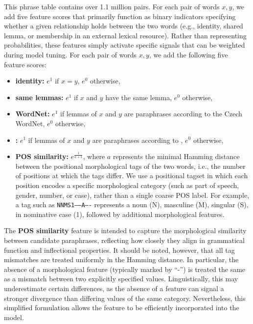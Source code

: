 This phrase table contains over 1.1 million pairs. For each pair of words $ x,y $, we add five feature scores that primarily function as binary indicators specifying whether a given relationship holds between the two words (e.g., identity, shared lemma, or membership in an external lexical resource). Rather than representing probabilities, these features simply activate specific signals that can be weighted during model tuning. For each pair of words $ x,y $, we add the following five feature scores:

\begin{itemize}
\item \textbf{identity:} $ e^1 $ if  $ x = y $, $e^0$ otherwise,
\item \textbf{same lemmas:} $ e^1$ if  $ x $ and $ y $ have the same lemma, $e^0$ otherwise,
\item \textbf{WordNet:} $e^1$ if  lemmas of $ x $ and $ y $ are paraphrases according to the Czech WordNet, $e^0$ otherwise,
\item \textbf{\fm:} $ e^1$ if  lemmas of $ x $ and $ y $ are paraphrases according to \fm, $e^0$ otherwise,
\item \textbf{POS similarity:} $ e^{\frac{1}{a+1}}$, where $ a $ represents the minimal Hamming distance between the positional morphological tags of the two words, i.e., the number of positions at which the tags differ. We use a positional tagset in which each position encodes a specific morphological category (such as part of speech, gender, number, or case), rather than a single coarse POS label. For example, a tag such as \texttt{NNMS1-----A----} represents a noun (N), masculine (M), singular (S), in nominative case (1), followed by additional morphological features.
\end{itemize}

The \textbf{POS similarity} feature is intended to capture the morphological similarity between candidate paraphrases, reflecting how closely they align in grammatical function and inflectional properties. It should be noted, however, that all tag mismatches are treated uniformly in the Hamming distance. In particular, the absence of a morphological feature (typically marked by ``-'') is treated the same as a mismatch between two explicitly specified values. Linguistically, this may underestimate certain differences, as the absence of a feature can signal a stronger divergence than differing values of the same category. Nevertheless, this simplified formulation allows the feature to be efficiently incorporated into the model.

